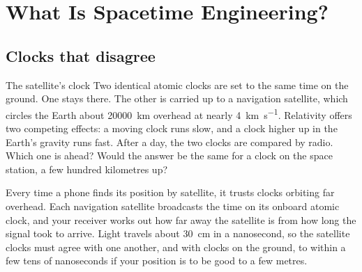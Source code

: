 \chapter{What Is Spacetime Engineering?}\label{ch:what-is}

\section{Clocks that disagree}\label{sec:gps}

\begin{thought}{The satellite's clock}
Two identical atomic clocks are set to the same time on the ground. One stays
there. The other is carried up to a navigation satellite, which circles the
Earth about \SI{20000}{\kilo\metre} overhead at nearly
\SI{4}{\kilo\metre\per\second}. Relativity offers two competing effects: a
moving clock runs slow, and a clock higher up in the Earth's gravity runs
fast. After a day, the two clocks are compared by radio. Which one is ahead?
Would the answer be the same for a clock on the space station, a few hundred
kilometres up?
\end{thought}

Every time a phone finds its position by satellite, it trusts clocks orbiting
far overhead. Each navigation satellite broadcasts the time on its onboard
atomic clock, and your receiver works out how far away the satellite is from
how long the signal took to arrive. Light travels about
\SI{30}{\centi\metre} in a nanosecond, so the satellite clocks must agree with
one another, and with clocks on the ground, to within a few tens of
nanoseconds if your position is to be good to a few metres.

